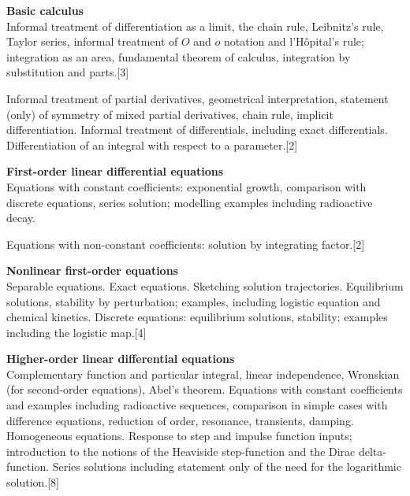 \documentclass[a4paper]{article}
\begin{document}
\maketitle
{\small
  \noindent\textbf{Basic calculus}\\
  Informal treatment of differentiation as a limit, the chain rule, Leibnitz's rule, Taylor series, informal treatment of $O$ and $o$ notation and l'H\^opital's rule; integration as an area, fundamental theorem of calculus, integration by substitution and parts.\hspace*{\fill}[3]

  \vspace{5pt}
  \noindent Informal treatment of partial derivatives, geometrical interpretation, statement (only) of symmetry of mixed partial derivatives, chain rule, implicit differentiation. Informal treatment of differentials, including exact differentials. Differentiation of an integral with respect to a parameter.\hspace*{\fill}[2]

  \vspace{10pt}
  \noindent\textbf{First-order linear differential equations}\\
  Equations with constant coefficients: exponential growth, comparison with discrete equations, series solution; modelling examples including radioactive decay.

  \vspace{5pt}
  \noindent Equations with non-constant coefficients: solution by integrating factor.\hspace*{\fill}[2]

  \vspace{10pt}
  \noindent\textbf{Nonlinear first-order equations}\\
  Separable equations. Exact equations. Sketching solution trajectories. Equilibrium solutions, stability by perturbation; examples, including logistic equation and chemical kinetics. Discrete equations: equilibrium solutions, stability; examples including the logistic map.\hspace*{\fill}[4]

  \vspace{10pt}
  \noindent\textbf{Higher-order linear differential equations}\\
  Complementary function and particular integral, linear independence, Wronskian (for second-order equations), Abel's theorem. Equations with constant coefficients and examples including radioactive sequences, comparison in simple cases with difference equations, reduction of order, resonance, transients, damping. Homogeneous equations. Response to step and impulse function inputs; introduction to the notions of the Heaviside step-function and the Dirac delta-function. Series solutions including statement only of the need for the logarithmic solution.\hspace*{\fill}[8]

}
\end{document}
